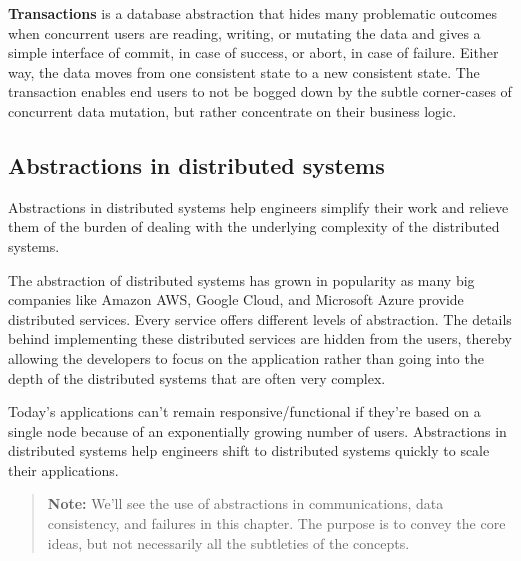 \textbf{Transactions} is a database abstraction that hides many problematic outcomes when concurrent users are reading, writing, or mutating the data and gives a simple interface of commit, in case of success, or abort, in case of failure. Either way, the data moves from one consistent state to a new consistent state. The transaction enables end users to not be bogged down by the subtle corner-cases of concurrent data mutation, but rather concentrate on their business logic.

\subsection{Abstractions in distributed systems}\label{EPN9zNFF9j8Vfc8WA0wvS}

Abstractions in distributed systems help engineers simplify their work and relieve them of the burden of dealing with the underlying complexity of the distributed systems.

The abstraction of distributed systems has grown in popularity as many big companies like Amazon AWS, Google Cloud, and Microsoft Azure provide distributed services. Every service offers different levels of abstraction. The details behind implementing these distributed services are hidden from the users, thereby allowing the developers to focus on the application rather than going into the depth of the distributed systems that are often very complex.

Today's applications can't remain responsive/functional if they're based on a single node because of an exponentially growing number of users. Abstractions in distributed systems help engineers shift to distributed systems quickly to scale their applications.
\begin{quote}
\textbf{Note:} We'll see the use of abstractions in communications, data consistency, and failures in this chapter. The purpose is to convey the core ideas, but not necessarily all the subtleties of the concepts.
\end{quote}



